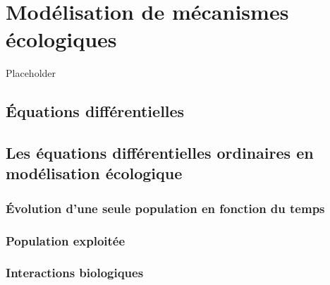 \documentclass[]{book}
\begin{document}
\hypertarget{chapitre-ode}{%
\chapter{Modélisation de mécanismes écologiques}\label{chapitre-ode}}

Placeholder

\hypertarget{uxe9quations-diffuxe9rentielles}{%
\section{Équations
différentielles}\label{uxe9quations-diffuxe9rentielles}}

\hypertarget{les-uxe9quations-diffuxe9rentielles-ordinaires-en-moduxe9lisation-uxe9cologique}{%
\section{Les équations différentielles ordinaires en modélisation
écologique}\label{les-uxe9quations-diffuxe9rentielles-ordinaires-en-moduxe9lisation-uxe9cologique}}

\hypertarget{uxe9volution-dune-seule-population-en-fonction-du-temps}{%
\subsection{Évolution d'une seule population en fonction du
temps}\label{uxe9volution-dune-seule-population-en-fonction-du-temps}}

\hypertarget{population-exploituxe9e}{%
\subsection{Population exploitée}\label{population-exploituxe9e}}

\hypertarget{interactions-biologiques}{%
\subsection{Interactions biologiques}\label{interactions-biologiques}}
\end{document}
